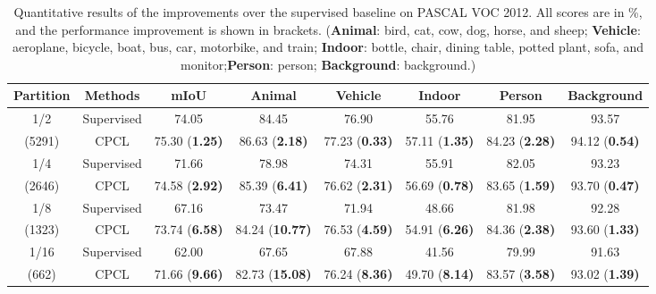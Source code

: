 \documentclass[journal]{IEEEtran}
\begin{document}
\begin{table*}[h]
 
  \footnotesize
  \caption{Quantitative results of the improvements over the supervised baseline on PASCAL VOC 2012. All scores are in \%, and the performance improvement is shown 
  in brackets. (\textbf{Animal}: bird, cat, cow, dog, horse, and sheep; \textbf{Vehicle}: aeroplane, bicycle, boat, bus, car, motorbike, and train; 
  \textbf{Indoor}: bottle, chair, dining table, potted plant, sofa, and monitor;\textbf{Person}: person;  \textbf{Background}: background.)}
  \begin{center}
  \renewcommand{\arraystretch}{1.3}
  \begin{tabular}{cc|c|ccccc} 
  \hline
    Partition   & Methods      & mIoU              & Animal             & Vehicle             & Indoor                   & Person            & Background       \\ \hline
    1/2         & Supervised   & 74.05             & 84.45              & 76.90               & 55.76                    & 81.95             & 93.57            \\
    (5291)      & CPCL         & 75.30 (\bf 1.25)  & 86.63 (\bf 2.18)   & 77.23 (\bf 0.33)    & 57.11 (\bf 1.35)         & 84.23 (\bf 2.28)  & 94.12 (\bf 0.54) \\ \hline
    1/4         & Supervised   & 71.66             & 78.98              & 74.31               & 55.91                    & 82.05             & 93.23            \\
    (2646)      & CPCL         & 74.58 (\bf 2.92)  & 85.39 (\bf 6.41)   & 76.62 (\bf 2.31)    & 56.69 (\bf 0.78)         & 83.65 (\bf 1.59)  & 93.70 (\bf 0.47) \\ \hline
    1/8         & Supervised   & 67.16             & 73.47              & 71.94               & 48.66                    & 81.98             & 92.28            \\
    (1323)      & CPCL         & 73.74 (\bf 6.58)  & 84.24 (\bf 10.77)  & 76.53 (\bf 4.59)    & 54.91 (\bf 6.26)         & 84.36 (\bf 2.38)  & 93.60 (\bf 1.33) \\ \hline
    1/16        & Supervised   & 62.00             & 67.65              & 67.88               & 41.56                    & 79.99             & 91.63            \\
    (662)       & CPCL         & 71.66 (\bf 9.66)  & 82.73 (\bf 15.08)  & 76.24 (\bf 8.36)    & 49.70 (\bf 8.14)         & 83.57 (\bf 3.58)  & 93.02 (\bf 1.39) \\ \hline

  \end{tabular}
  \end{center}
  \label{tab:voc_sup_unsup}
\end{table*}
	
\end{document}
